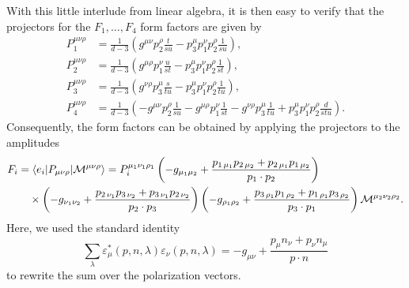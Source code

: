 With this little interlude from linear algebra, it is then easy to verify that the projectors for the $F_1,\ldots , F_4$ form factors are given by
\begin{equation}
\begin{split}
P_1^{\mu \nu \rho} &= \frac{1}{d - 3} \left( g^{\mu \nu} p_2^\rho \frac{t}{su} - p_3^\mu p_1^\nu p_2^\rho \frac{1}{su} \right), \\
P_2^{\mu \nu \rho} &= \frac{1}{d - 3} \left( g^{\mu \rho} p_1^\nu \frac{u}{s t} - p_3^\mu p_1^\nu p_2^\rho \frac{1}{st} \right), \\
P_3^{\mu \nu \rho} &= \frac{1}{d - 3} \left( g^{\nu \rho} p_3^\mu \frac{s}{t u} - p_3^\mu p_1^\nu p_2^\rho \frac{1}{t u} \right), \\
P_4^{\mu \nu \rho} &= \frac{1}{d - 3} \left( - g^{\mu \nu} p_2^\rho \frac{1}{s u} - g^{\mu \rho} p_1^\nu \frac{1}{s t} - g^{\nu \rho} p_3^\mu \frac{1}{t u} + p_3^\mu p_1^\nu p_2^\rho \frac{d}{s t u} \right).
\end{split}
\end{equation}
Consequently, the form factors can be obtained by applying the projectors to the amplitudes
\begin{equation}
\begin{split}
&F_i = \braket{e_i| P_{\mu \nu \rho} | \mathcal{M}^{\mu \nu \rho}} = P_i^{\mu_1 \nu_1 \rho_1} \left(-g_{\mu_1 \mu_2} + \frac{p_{1\, \mu_1} p_{2\, \mu_2} + p_{2\, \mu_1} p_{1\, \mu_2}}{p_1 \cdot p_2} \right) \\
& \qquad \times \left(-g_{\nu_1 \nu_2} + \frac{p_{2\, \nu_1} p_{3\, \nu_2} + p_{3\, \nu_1} p_{2\, \nu_2}}{p_2 \cdot p_3} \right) \left(-g_{\rho_1 \rho_2} + \frac{p_{3\, \rho_1} p_{1\, \rho_2} + p_{1\, \rho_1} p_{3\, \rho_2}}{p_3 \cdot p_1} \right) \mathcal{M}^{\mu_2 \nu_2 \rho_2}.
\end{split}
\end{equation}
Here, we used the standard identity
\begin{equation}
\sum_{\lambda} \varepsilon^{*}_\mu (p, n, \lambda) \varepsilon_\nu(p, n, \lambda) = -g_{\mu \nu} + \frac{p_\mu n_\nu + p_\nu n_\mu}{p \cdot n}
\end{equation}
to rewrite the sum over the polarization vectors.

